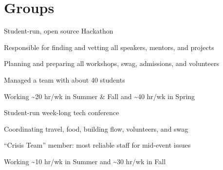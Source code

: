 \documentclass[]{deedy-resume-openfont}
\begin{document}
\begin{minipage}[t]{0.66\textwidth}

\section{Groups}
\begin{tightemize}
\item Student-run, open source Hackathon
\item Responsible for finding and vetting all speakers, mentors, and projects
\item Planning and preparing all workshops, swag, admissions, and volunteers
\item Managed a team with about 40 students
\item Working \textasciitilde20 hr/wk in Summer \& Fall and \textasciitilde40 hr/wk in Spring
\end{tightemize}
\sectionsep

\begin{tightemize}
\item Student-run week-long tech conference
\item Coordinating travel, food, building flow, volunteers, and swag
\item ``Crisis Team'' member: most reliable staff for mid-event issues
\item Working \textasciitilde10 hr/wk in Summer and \textasciitilde30 hr/wk in Fall
\end{tightemize}

\end{minipage}
\end{document}
